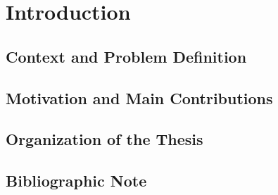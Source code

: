 \chapter{Introduction}
\label{intro}


\section{Context and Problem Definition}


\section{Motivation and Main Contributions}

\section{Organization of the Thesis}

\section{Bibliographic Note}
